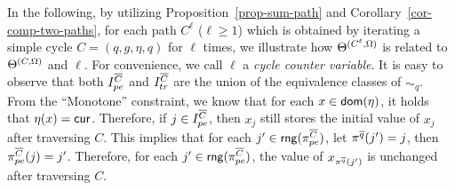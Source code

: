 In the following, by utilizing Proposition~\ref{prop-sum-path} and Corollary~\ref{cor-comp-two-paths}, for each path $C^{\ell}$ ($\ell \ge 1$) which is obtained by iterating a simple cycle $C = (q, g, \eta, q)$ for $\ell$ times, we illustrate how $\Theta^{(C^\ell,\Omega)}$ is related to $\Theta^{(C, \Omega)}$ and $\ell$. For convenience, we call $\ell$ a \emph{cycle counter variable}. It is easy to observe that both $I^{\overline{C}}_{pe}$ and $I^{\overline{C}}_{tr}$ are the union of the equivalence classes of $\sim_{q}$. From the ``Monotone'' constraint, we know that for each $x \in \mathsf{dom}(\eta)$, it holds that $\eta(x)=\mathsf{cur}$. Therefore, if $j \in I^{\overline{C}}_{pe}$, then $x_j$ still stores the initial value of $x_j$ after traversing $C$. 
%
This implies that for each $j' \in \mathsf{rng}(\pi^{\overline{C}}_{pe})$, let $\pi^{\overline{q}}(j')=j$, then $\pi^{\overline{C}}_{pe}(j)=j'$.  Therefore, for each $j' \in \mathsf{rng}(\pi^{\overline{C}}_{pe})$, the value of $x_{\pi^{\overline{q}}(j')}$ is unchanged after traversing $C$.
